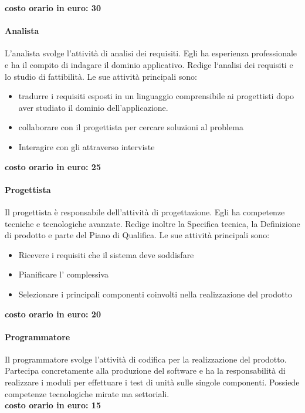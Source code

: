 \documentclass[../norme-di-progetto.tex]{subfiles}
\begin{document}
\textbf{costo orario in euro: 30}

\paragraph{Analista}%
\label{par:analista}
L'analista svolge l'attività di analisi dei requisiti.
Egli ha esperienza professionale e ha il compito di indagare il dominio applicativo.
Redige l`analisi dei requisiti e lo studio di fattibilità. Le sue attività principali sono:

\begin{itemize}
  \item tradurre i requisiti esposti in un linguaggio comprensibile ai progettisti dopo aver studiato il dominio dell'applicazione.
  \item collaborare con il progettista per cercare soluzioni al problema
  \item Interagire con gli  attraverso interviste
\end{itemize}

\textbf{costo orario in euro: 25}

\paragraph{Progettista}%
\label{par:progettista}
Il progettista è responsabile dell'attività di progettazione.
Egli ha competenze tecniche e tecnologiche avanzate.
Redige inoltre la Specifica tecnica, la Definizione di prodotto e parte del Piano di Qualifica.
Le sue attività principali sono:

\begin{itemize}
  \item Ricevere i requisiti che il sistema deve soddisfare
  \item Pianificare l' complessiva
  \item Selezionare i principali componenti coinvolti nella realizzazione del prodotto
\end{itemize}

\textbf{costo orario in euro: 20}

\paragraph{Programmatore}%
\label{par:programmatore}
Il programmatore svolge l'attività di codifica per la realizzazione del prodotto.
Partecipa concretamente alla produzione del software e ha la responsabilità di realizzare i moduli per effettuare i test di unità sulle singole componenti.
Possiede competenze tecnologiche mirate ma settoriali.
\\\newline\textbf{costo orario in euro: 15}
\end{document}
